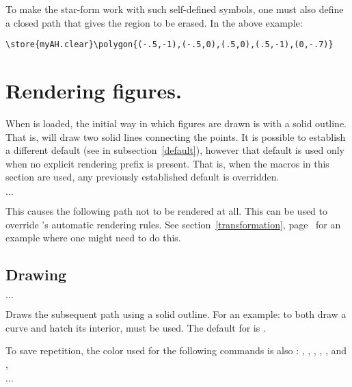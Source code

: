 \documentclass[letterpaper]{article}
\begin{document}
To make the star-form work with such self-defined symbols, one must also
define a closed path  that gives the region to be
erased. In the above example:
\begin{verbatim}
\store{myAH.clear}\polygon{(-.5,-1),(-.5,0),(.5,0),(.5,-1),(0,-.7)}
\end{verbatim}


\section{Rendering figures.}\label{rendering}

When \mfp{} is loaded, the initial way in which figures are drawn is
with a solid outline. That is,  will
draw two solid lines connecting the points. It is possible to establish
a different default (see  in subsection~\ref{default}),
however that default is used only when no explicit rendering prefix is
present. That is, when the macros in this section are used, any
previously established default is overridden.

\begin{cd}
$\ldots$%
%
\end{cd}

This causes the following path not to be rendered at all. This can be
used to override \mfp{}'s automatic rendering rules. See
section~\ref{transformation}, page~\pageref{norenderexample} for an
example where one might need to do this.

\subsection{Drawing}\label{drawing}

\begin{cd}
$\ldots$%
\end{cd}

Draws the subsequent path using a solid outline. For an example: to both
draw a curve and hatch its interior,  must be used.
The default for  is .

To save repetition, the color used for the following commands is also
: , , , ,
, and ,

\begin{cd}
$\ldots$
\end{cd}
\end{document}
